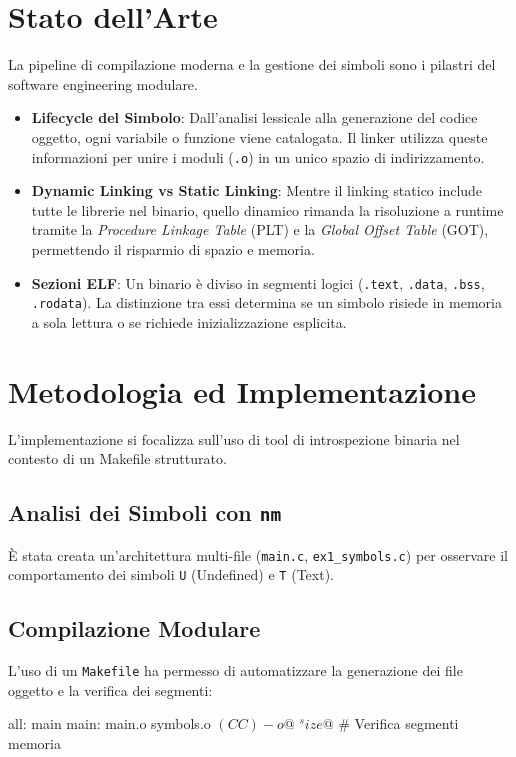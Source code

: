 \documentclass[a4paper,12pt]{article}
\begin{document}
\section{Stato dell'Arte}
La pipeline di compilazione moderna e la gestione dei simboli sono i pilastri del software engineering modulare.
\begin{itemize}
    \item \textbf{Lifecycle del Simbolo}: Dall'analisi lessicale alla generazione del codice oggetto, ogni variabile o funzione viene catalogata. Il linker utilizza queste informazioni per unire i moduli (\texttt{.o}) in un unico spazio di indirizzamento.
    \item \textbf{Dynamic Linking vs Static Linking}: Mentre il linking statico include tutte le librerie nel binario, quello dinamico rimanda la risoluzione a runtime tramite la \textit{Procedure Linkage Table} (PLT) e la \textit{Global Offset Table} (GOT), permettendo il risparmio di spazio e memoria.
    \item \textbf{Sezioni ELF}: Un binario è diviso in segmenti logici (\texttt{.text}, \texttt{.data}, \texttt{.bss}, \texttt{.rodata}). La distinzione tra essi determina se un simbolo risiede in memoria a sola lettura o se richiede inizializzazione esplicita.
\end{itemize}

\section{Metodologia ed Implementazione}
L'implementazione si focalizza sull'uso di tool di introspezione binaria nel contesto di un Makefile strutturato.

\subsection{Analisi dei Simboli con \texttt{nm}}
È stata creata un'architettura multi-file (\texttt{main.c}, \texttt{ex1_symbols.c}) per osservare il comportamento dei simboli \texttt{U} (Undefined) e \texttt{T} (Text).

\subsection{Compilazione Modulare}
L'uso di un \texttt{Makefile} ha permesso di automatizzare la generazione dei file oggetto e la verifica dei segmenti:
\begin{ccode}
all: main
main: main.o symbols.o
    $(CC) -o $@ $^
    size $@ # Verifica segmenti memoria
\end{ccode}
\end{document}

